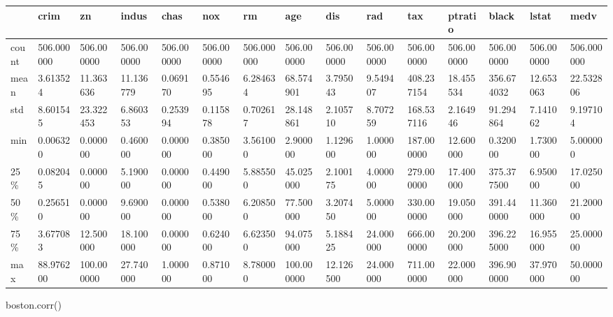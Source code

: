 \documentclass[
  letterpaper,
  DIV=11,
  numbers=noendperiod]{scrreprt}
\newenvironment{Shaded}{\begin{snugshade}}{\end{snugshade}}
\newcommand{\NormalTok}[1]{\textcolor[rgb]{0.00,0.23,0.31}{#1}}
\begin{document}
\begin{longtable}[]{@{}lllllllllllllll@{}}
\toprule()
& crim & zn & indus & chas & nox & rm & age & dis & rad & tax & ptratio
& black & lstat & medv \\
\midrule()
\endhead
count & 506.000000 & 506.000000 & 506.000000 & 506.000000 & 506.000000 &
506.000000 & 506.000000 & 506.000000 & 506.000000 & 506.000000 &
506.000000 & 506.000000 & 506.000000 & 506.000000 \\
mean & 3.613524 & 11.363636 & 11.136779 & 0.069170 & 0.554695 & 6.284634
& 68.574901 & 3.795043 & 9.549407 & 408.237154 & 18.455534 & 356.674032
& 12.653063 & 22.532806 \\
std & 8.601545 & 23.322453 & 6.860353 & 0.253994 & 0.115878 & 0.702617 &
28.148861 & 2.105710 & 8.707259 & 168.537116 & 2.164946 & 91.294864 &
7.141062 & 9.197104 \\
min & 0.006320 & 0.000000 & 0.460000 & 0.000000 & 0.385000 & 3.561000 &
2.900000 & 1.129600 & 1.000000 & 187.000000 & 12.600000 & 0.320000 &
1.730000 & 5.000000 \\
25\% & 0.082045 & 0.000000 & 5.190000 & 0.000000 & 0.449000 & 5.885500 &
45.025000 & 2.100175 & 4.000000 & 279.000000 & 17.400000 & 375.377500 &
6.950000 & 17.025000 \\
50\% & 0.256510 & 0.000000 & 9.690000 & 0.000000 & 0.538000 & 6.208500 &
77.500000 & 3.207450 & 5.000000 & 330.000000 & 19.050000 & 391.440000 &
11.360000 & 21.200000 \\
75\% & 3.677083 & 12.500000 & 18.100000 & 0.000000 & 0.624000 & 6.623500
& 94.075000 & 5.188425 & 24.000000 & 666.000000 & 20.200000 & 396.225000
& 16.955000 & 25.000000 \\
max & 88.976200 & 100.000000 & 27.740000 & 1.000000 & 0.871000 &
8.780000 & 100.000000 & 12.126500 & 24.000000 & 711.000000 & 22.000000 &
396.900000 & 37.970000 & 50.000000 \\
\bottomrule()
\end{longtable}

\begin{Shaded}
\begin{Highlighting}[]
\NormalTok{boston.corr()}
\end{Highlighting}
\end{Shaded}
\end{document}
